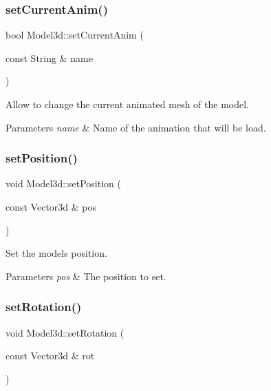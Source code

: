 \subsubsection{\texorpdfstring{set\+Current\+Anim()}{setCurrentAnim()}}
{\footnotesize\ttfamily bool Model3d\+::set\+Current\+Anim (\begin{DoxyParamCaption}\item[{const String \&}]{name }\end{DoxyParamCaption})}



Allow to change the current animated mesh of the model. 


\begin{DoxyParams}{Parameters}
{\em name} & Name of the animation that will be load. \\
\hline
\end{DoxyParams}
\mbox{\label{classModel3d_a971b77ce978903443e71187ceafa1528}} 
\subsubsection{\texorpdfstring{set\+Position()}{setPosition()}}
{\footnotesize\ttfamily void Model3d\+::set\+Position (\begin{DoxyParamCaption}\item[{const Vector3d \&}]{pos }\end{DoxyParamCaption})}



Set the model\textquotesingle{}s position. 


\begin{DoxyParams}{Parameters}
{\em pos} & The position to set. \\
\hline
\end{DoxyParams}
\mbox{\label{classModel3d_adc3c185a679687b4bf483f89eb2c20a9}} 
\subsubsection{\texorpdfstring{set\+Rotation()}{setRotation()}}
{\footnotesize\ttfamily void Model3d\+::set\+Rotation (\begin{DoxyParamCaption}\item[{const Vector3d \&}]{rot }\end{DoxyParamCaption})}



